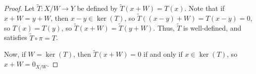 \begin{proof}
  Let $\widetilde{T}\colon X/W\rightarrow Y$ be defined by $\widetilde{T}\left(x + W\right) = T(x)$. Note that if $x + W = y + W$, then $x-y\in \ker(T)$, so $\widetilde{T}\left((x-y) + W\right) = T(x-y) = 0$, so $T(x) = T(y)$, so $\widetilde{T}(x+W) = \widetilde{T}(y+W)$. Thus, $\widetilde{T}$ is well-defined, and satisfies $\widetilde{T} \circ \pi = T$.\newline

  Now, if $W = \ker(T)$, then $\widetilde{T}(x+W) = 0$ if and only if $x\in \ker(T)$, so $x + W = 0_{X/W}$.
\end{proof}
